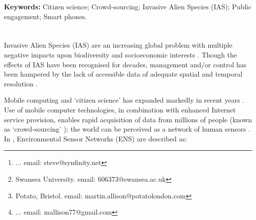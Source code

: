 \documentclass[10pt,psfig,letterpaper,twocolumn]{article}
\begin{document}
% 
%


\title{}
\author{
{}\thanks{... email: steve@synfinity.net }, \and
{}\thanks{Swansea University. email: 606373@swansea.ac.uk}, \and 
{}\thanks{Potato, Bristol. email: martin.allison@potatolondon.com}, \and
{}\thanks{... email: mallison77@gmail.com}\\
}
\date{}
\maketitle
\thispagestyle{empty}
\begin{abstract}
Invasive Alien Species (IAS) are a growing global problem, reducing biodiversity and causing significant negative socioeconomic impacts. Management and control is hampered by a lack of accessible data of adequate spatial and temporal resolution. Smart phone technology and cheap access to data networks may enable crowd-sourcing of IAS data to bridge the `data gap'. By engaging the general public in `citizen science', IAS-ESS (iAssess) aims to provide much-needed, real-time data to scientists.
\end{abstract}
{\bf Keywords:}
Citizen science; Crowd-sourcing; Invasive Alien Species (IAS);  Public engagement; Smart phones.
\section*{}

Invasive Alien Species (IAS) are an increasing global problem with multiple negative impacts upon biodiversity and socioeconomic interests \cite{Pimentel:2005p4121, Vila:2011ft, Vitousek:1997p78}. Though the effects of IAS have been recognised for decades, management and/or control has been hampered by the lack of accessible data of adequate spatial and temporal resolution  \cite{Vitousek:1997p78}.

Mobile computing and `citizen science' has expanded markedly in recent years \cite{Silvertown:2009tw}. Use of mobile computer technologies, in combination with enhanced Internet service provision, enables rapid acquisition of data from millions of people (known as `crowd-sourcing' \cite{Wired:2011uj}); the world can be perceived as a network of human sensors \cite{Goodchild:2007vt}. In \citet{Hart:2006uz}, Environmental Sensor Networks (ENS) are described as:
\end{document}
